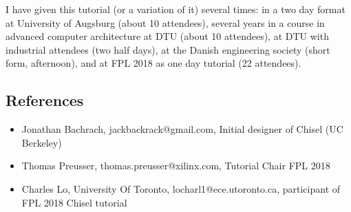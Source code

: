 \documentclass{article}
\begin{document}


I have given this tutorial (or a variation of it) several times:
in a two day format at University of Augsburg (about 10 attendees), several years
in a course in advanced computer architecture at DTU (about 10 attendees), at DTU with industrial attendees
(two half days), at the Danish engineering society (short form, afternoon),
and at FPL 2018 as one day tutorial (22 attendees).


\subsection*{References}

\begin{itemize}
\item Jonathan Bachrach, jackbackrack@gmail.com, Initial designer of Chisel (UC Berkeley)
\item Thomas Preusser, thomas.preusser@xilinx.com, Tutorial Chair FPL 2018
\item Charles Lo, University Of Toronto, locharl1@ece.utoronto.ca, participant of FPL 2018 Chisel tutorial
\end{itemize}
\end{document}
